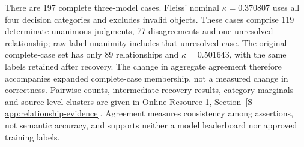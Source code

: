 There are 197 complete three-model cases. Fleiss' nominal $\kappa=0.370807$ uses all four decision categories and excludes invalid objects. These cases comprise 119 determinate unanimous judgments, 77 disagreements and one unresolved relationship; raw label unanimity includes that unresolved case. The original complete-case set has only 89 relationships and $\kappa=0.501643$, with the same labels retained after recovery. The change in aggregate agreement therefore accompanies expanded complete-case membership, not a measured change in correctness. Pairwise counts, intermediate recovery results, category marginals and source-level clusters are given in Online Resource 1, Section~\ref{S-app:relationship-evidence}. Agreement measures consistency among assertions, not semantic accuracy, and supports neither a model leaderboard nor approved training labels.
